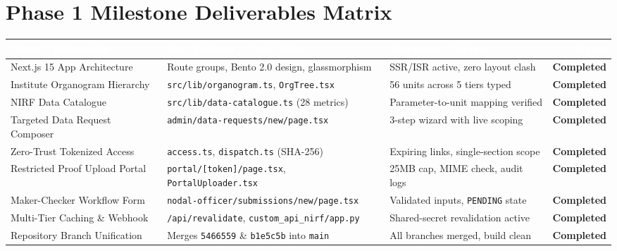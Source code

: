 \documentclass[11pt,a4paper]{article}
\begin{document}
\section{Phase 1 Milestone Deliverables Matrix}

\begin{table}[h]
\centering
\small
\renewcommand{\arraystretch}{1.2}
\begin{tabular}{p{5.5cm} p{5.5cm} p{2.2cm} r}
\toprule
\rowcolor{primary}
\textcolor{white}{\textbf{Phase 1 Deliverable}} & \textcolor{white}{\textbf{Key Artifacts / Code Paths}} & \textcolor{white}{\textbf{Acceptance Criteria}} & \textcolor{white}{\textbf{Status}} \\
\midrule
Next.js 15 App Architecture & Route groups, Bento 2.0 design, glassmorphism & SSR/ISR active, zero layout clash & \textcolor{accentgreen}{\textbf{Completed}} \\
\rowcolor{lightbg}
Institute Organogram Hierarchy & \texttt{src/lib/organogram.ts}, \texttt{OrgTree.tsx} & 56 units across 5 tiers typed & \textcolor{accentgreen}{\textbf{Completed}} \\
NIRF Data Catalogue & \texttt{src/lib/data-catalogue.ts} (28 metrics) & Parameter-to-unit mapping verified & \textcolor{accentgreen}{\textbf{Completed}} \\
\rowcolor{lightbg}
Targeted Data Request Composer & \texttt{admin/data-requests/new/page.tsx} & 3-step wizard with live scoping & \textcolor{accentgreen}{\textbf{Completed}} \\
Zero-Trust Tokenized Access & \texttt{access.ts}, \texttt{dispatch.ts} (SHA-256) & Expiring links, single-section scope & \textcolor{accentgreen}{\textbf{Completed}} \\
\rowcolor{lightbg}
Restricted Proof Upload Portal & \texttt{portal/[token]/page.tsx}, \texttt{PortalUploader.tsx} & 25MB cap, MIME check, audit logs & \textcolor{accentgreen}{\textbf{Completed}} \\
Maker-Checker Workflow Form & \texttt{nodal-officer/submissions/new/page.tsx} & Validated inputs, \texttt{PENDING} state & \textcolor{accentgreen}{\textbf{Completed}} \\
\rowcolor{lightbg}
Multi-Tier Caching \& Webhook & \texttt{/api/revalidate}, \texttt{custom\_api\_nirf/app.py} & Shared-secret revalidation active & \textcolor{accentgreen}{\textbf{Completed}} \\
Repository Branch Unification & Merges \texttt{5466559} \& \texttt{b1e5c5b} into \texttt{main} & All branches merged, build clean & \textcolor{accentgreen}{\textbf{Completed}} \\
\bottomrule
\end{tabular}
\end{table}
\end{document}
